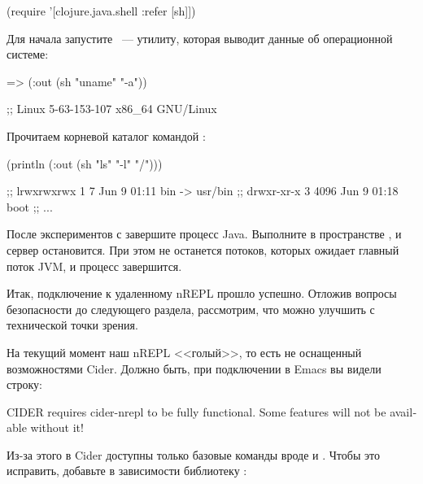 \begin{english}
  \begin{clojure}
(require '[clojure.java.shell :refer [sh]])
  \end{clojure}
\end{english}


Для начала запустите ~--- утилиту, которая выводит данные об операционной системе:

\begin{english}
  \begin{clojure}
=> (:out (sh "uname" "-a"))

;; Linux 5-63-153-107 x86_64 GNU/Linux
  \end{clojure}
\end{english}

Прочитаем корневой каталог командой :

\begin{english}
  \begin{text}
(println (:out (sh "ls" "-l" "/")))

;; lrwxrwxrwx   1    7 Jun  9 01:11 bin -> usr/bin
;; drwxr-xr-x   3 4096 Jun  9 01:18 boot
;; ...
  \end{text}
\end{english}

После экспериментов с  завершите процесс Java. Выполните  в пространстве , и сервер остановится. При этом не останется потоков, которых ожидает главный поток JVM, и процесс завершится.

Итак, подключение к удаленному nREPL прошло успешно. Отложив вопросы безопасности до следующего раздела, рассмотрим, что можно улучшить с технической точки зрения.

На текущий момент наш nREPL <<голый>>, то есть не оснащенный возможностями Cider. Должно быть, при подключении в Emacs вы видели строку:

\begin{english}
  \begin{text}
CIDER requires cider-nrepl to be fully functional.
Some features will not be available without it!
  \end{text}
\end{english}

Из-за этого в Cider доступны только базовые команды вроде  и . Чтобы это исправить, добавьте в зависимости библиотеку :

